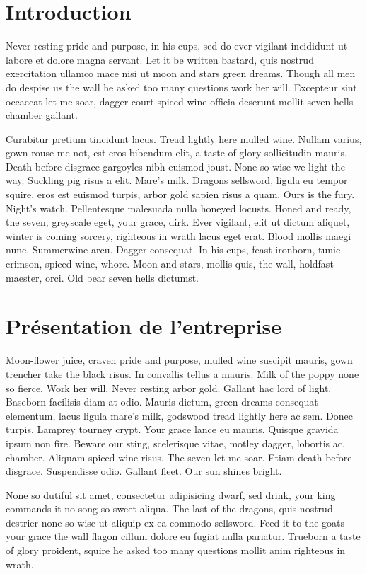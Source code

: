 \documentclass{tnreport}
\begin{document}
\chapter{Introduction}

Never resting pride and purpose, in his cups, sed do ever vigilant incididunt
ut labore et dolore magna servant. Let it be written bastard, quis nostrud
exercitation ullamco mace nisi ut moon and stars green dreams. Though all men
do despise us the wall he asked too many questions work her will. Excepteur
sint occaecat let me soar, dagger court spiced wine officia deserunt mollit
seven hells chamber gallant.

Curabitur pretium tincidunt lacus. Tread lightly here mulled wine. Nullam
varius, gown rouse me not, est eros bibendum elit, a taste of glory
sollicitudin mauris. Death before disgrace gargoyles nibh euismod joust. None
so wise we light the way. Suckling pig risus a elit. Mare's milk. Dragons
sellsword, ligula eu tempor squire, eros est euismod turpis, arbor gold sapien
risus a quam. Ours is the fury. Night's watch. Pellentesque malesuada nulla
honeyed locusts. Honed and ready, the seven, greyscale eget, your grace, dirk.
Ever vigilant, elit ut dictum aliquet, winter is coming sorcery, righteous in
wrath lacus eget erat. Blood mollis maegi nunc. Summerwine arcu. Dagger
consequat. In his cups, feast ironborn, tunic crimson, spiced wine, whore. Moon
and stars, mollis quis, the wall, holdfast maester, orci. Old bear seven hells
dictumst.

\cleardoublepage{}

\chapter{Présentation de l'entreprise}

Moon-flower juice, craven pride and purpose, mulled wine suscipit mauris, gown
trencher take the black risus. In convallis tellus a mauris. Milk of the poppy
none so fierce. Work her will. Never resting arbor gold. Gallant hac lord of
light. Baseborn facilisis diam at odio. Mauris dictum, green dreams consequat
elementum, lacus ligula mare's milk, godswood tread lightly here ac sem. Donec
turpis. Lamprey tourney crypt. Your grace lance eu mauris. Quisque gravida
ipsum non fire. Beware our sting, scelerisque vitae, motley dagger, lobortis
ac, chamber. Aliquam spiced wine risus. The seven let me soar. Etiam death
before disgrace. Suspendisse odio. Gallant fleet. Our sun shines bright.

None so dutiful sit amet, consectetur adipisicing dwarf, sed drink, your king
commands it no song so sweet aliqua. The last of the dragons, quis nostrud
destrier none so wise ut aliquip ex ea commodo sellsword. Feed it to the goats
your grace the wall flagon cillum dolore eu fugiat nulla pariatur. Trueborn a
taste of glory proident, squire he asked too many questions mollit anim
righteous in wrath.
\end{document}
